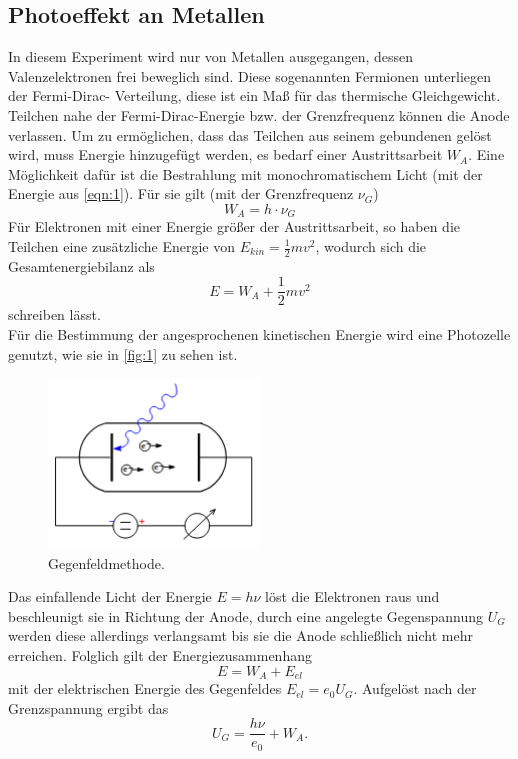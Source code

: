 \subsection{Photoeffekt an Metallen}
In diesem Experiment wird nur von Metallen ausgegangen, dessen Valenzelektronen 
frei beweglich sind. Diese sogenannten Fermionen unterliegen der Fermi-Dirac-
Verteilung, diese ist ein Maß für das thermische Gleichgewicht. Teilchen nahe 
der Fermi-Dirac-Energie bzw. der Grenzfrequenz können die Anode verlassen. Um
zu ermöglichen, dass das Teilchen aus seinem gebundenen gelöst wird, muss Energie
hinzugefügt werden, es bedarf einer Austrittsarbeit $W_A$. Eine Möglichkeit
dafür ist die Bestrahlung mit monochromatischem Licht (mit der Energie aus
\autoref{eqn:1}). Für sie gilt (mit der Grenzfrequenz $\nu_G$)
\begin{equation}
    \label{eqn:2}
    W_A = h \cdot \nu_G
\end{equation}
Für Elektronen mit einer Energie größer der Austrittsarbeit, so haben die 
Teilchen eine zusätzliche Energie von $E_{kin} = \frac{1}{2} m v^2$, wodurch sich 
die Gesamtenergiebilanz als 
\begin{equation}
    \label{eqn:3}
    E = W_A + \frac{1}{2} m v^2
\end{equation}
schreiben lässt.
\vspace{0.5em}
\\
Für die Bestimmung der angesprochenen kinetischen Energie wird eine Photozelle 
genutzt, wie sie in \autoref{fig:1} zu sehen ist.
\begin{figure}[H]
    \centering
        \centering
        \includegraphics[width=0.5\textwidth]{Bilder/ggfeld.png}
        \caption{Gegenfeldmethode. \cite{anleitung9}}
    \hfill
    \label{fig:1}
\end{figure}
\noindent Das einfallende Licht der Energie $E= h \nu$ löst die Elektronen raus und
beschleunigt sie in Richtung der Anode, durch eine angelegte Gegenspannung $U_G$
werden diese allerdings verlangsamt bis sie die Anode schließlich nicht mehr 
erreichen. Folglich gilt der Energiezusammenhang
\begin{equation}
    \label{eqn:4}
    E = W_A + E_{el}
\end{equation}
mit der elektrischen Energie des Gegenfeldes $E_{el} = e_0 U_G$. Aufgelöst nach 
der Grenzspannung ergibt das
\begin{equation}
    \label{eqn:5}
    U_G = \frac{h \nu}{e_0} + W_A.
\end{equation}

